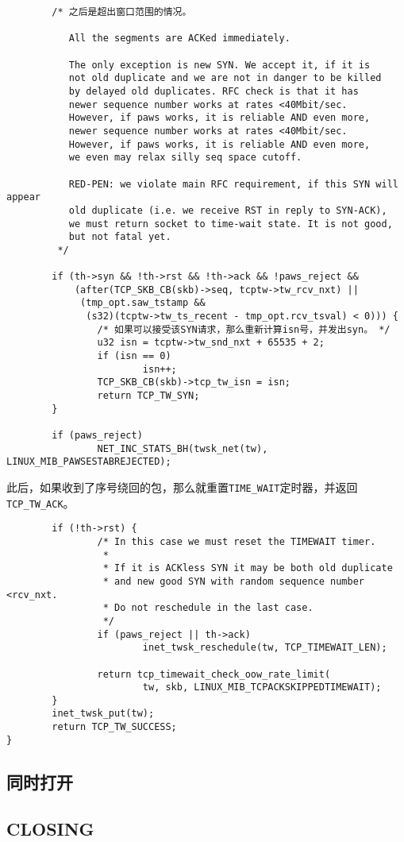 \begin{verbatim}
        /* 之后是超出窗口范围的情况。

           All the segments are ACKed immediately.

           The only exception is new SYN. We accept it, if it is
           not old duplicate and we are not in danger to be killed
           by delayed old duplicates. RFC check is that it has
           newer sequence number works at rates <40Mbit/sec.
           However, if paws works, it is reliable AND even more,
           newer sequence number works at rates <40Mbit/sec.
           However, if paws works, it is reliable AND even more,
           we even may relax silly seq space cutoff.

           RED-PEN: we violate main RFC requirement, if this SYN will appear
           old duplicate (i.e. we receive RST in reply to SYN-ACK),
           we must return socket to time-wait state. It is not good,
           but not fatal yet.
         */

        if (th->syn && !th->rst && !th->ack && !paws_reject &&
            (after(TCP_SKB_CB(skb)->seq, tcptw->tw_rcv_nxt) ||
             (tmp_opt.saw_tstamp &&
              (s32)(tcptw->tw_ts_recent - tmp_opt.rcv_tsval) < 0))) {
                /* 如果可以接受该SYN请求，那么重新计算isn号，并发出syn。 */
                u32 isn = tcptw->tw_snd_nxt + 65535 + 2;
                if (isn == 0)
                        isn++;
                TCP_SKB_CB(skb)->tcp_tw_isn = isn;
                return TCP_TW_SYN;
        }

        if (paws_reject)
                NET_INC_STATS_BH(twsk_net(tw), LINUX_MIB_PAWSESTABREJECTED);
\end{verbatim}
此后，如果收到了序号绕回的包，那么就重置\texttt{TIME_WAIT}定时器，并返回
\texttt{TCP_TW_ACK}。
\begin{verbatim}
        if (!th->rst) {
                /* In this case we must reset the TIMEWAIT timer.
                 *
                 * If it is ACKless SYN it may be both old duplicate
                 * and new good SYN with random sequence number <rcv_nxt.
                 * Do not reschedule in the last case.
                 */
                if (paws_reject || th->ack)
                        inet_twsk_reschedule(tw, TCP_TIMEWAIT_LEN);

                return tcp_timewait_check_oow_rate_limit(
                        tw, skb, LINUX_MIB_TCPACKSKIPPEDTIMEWAIT);
        }
        inet_twsk_put(tw);
        return TCP_TW_SUCCESS;
}
\end{verbatim}

\subsection{同时打开}
\label{subsec:fin_at_same_time}

\subsection{CLOSING}
